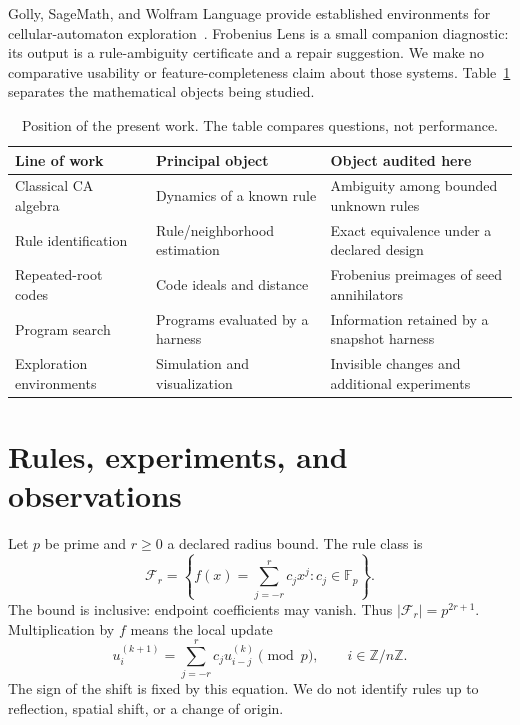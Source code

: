\documentclass[11pt]{article}
\newcommand{\Fp}{\mathbb F_p}
\begin{document}
Golly, SageMath, and Wolfram Language provide established environments for cellular-automaton exploration~\cite{golly,sage,wolfram}. Frobenius Lens is a small companion diagnostic: its output is a rule-ambiguity certificate and a repair suggestion. We make no comparative usability or feature-completeness claim about those systems. Table~\ref{tab:position} separates the mathematical objects being studied.

\begin{table}[t]
\centering\small
\caption{Position of the present work. The table compares questions, not performance.}
\label{tab:position}
\begin{tabular}{@{}p{.27\linewidth}p{.30\linewidth}p{.35\linewidth}@{}}
\toprule
Line of work & Principal object & Object audited here\\\midrule
Classical CA algebra~\cite{martin1984} & Dynamics of a known rule & Ambiguity among bounded unknown rules\\
Rule identification~\cite{sun2011,zhao2006} & Rule/neighborhood estimation & Exact equivalence under a declared design\\
Repeated-root codes~\cite{castagnoli1991} & Code ideals and distance & Frobenius preimages of seed annihilators\\
Program search~\cite{funsearch,alphaevolve} & Programs evaluated by a harness & Information retained by a snapshot harness\\
Exploration environments~\cite{golly,sage,wolfram} & Simulation and visualization & Invisible changes and additional experiments\\\bottomrule
\end{tabular}
\end{table}

\section{Rules, experiments, and observations}
Let $p$ be prime and $r\geq0$ a declared radius bound. The rule class is
\begin{equation}
\mathcal F_r=\left\{f(x)=\sum_{j=-r}^{r}c_jx^j:c_j\in\Fp\right\}.
\end{equation}
The bound is inclusive: endpoint coefficients may vanish. Thus $|\mathcal F_r|=p^{2r+1}$. Multiplication by $f$ means the local update
\begin{equation}
 u_i^{(k+1)}=\sum_{j=-r}^{r}c_j u_{i-j}^{(k)}\pmod p,
 \qquad i\in\mathbb Z/n\mathbb Z.
 \label{eq:update}
\end{equation}
The sign of the shift is fixed by this equation. We do not identify rules up to reflection, spatial shift, or a change of origin.
\end{document}
